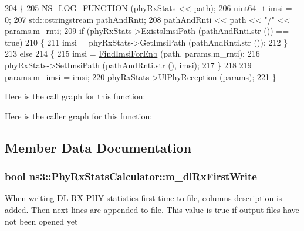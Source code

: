 \begin{DoxyCode}
204 \{
205   \hyperlink{log-macros-disabled_8h_a90b90d5bad1f39cb1b64923ea94c0761}{NS\_LOG\_FUNCTION} (phyRxStats << path);
206   uint64\_t imsi = 0;
207   std::ostringstream pathAndRnti;
208   pathAndRnti << path << \textcolor{stringliteral}{"/"} << params.m\_rnti;
209   \textcolor{keywordflow}{if} (phyRxStats->ExistsImsiPath (pathAndRnti.str ()) == \textcolor{keyword}{true})
210     \{
211       imsi = phyRxStats->GetImsiPath (pathAndRnti.str ());
212     \}
213   \textcolor{keywordflow}{else}
214     \{
215       imsi = \hyperlink{classns3_1_1LteStatsCalculator_af6ffb642f9ef86076a53331e7aefdcb0}{FindImsiForEnb} (path, params.m\_rnti);
216       phyRxStats->SetImsiPath (pathAndRnti.str (), imsi);
217     \}
218 
219   params.m\_imsi = imsi;
220   phyRxStats->UlPhyReception (params);
221 \}
\end{DoxyCode}


Here is the call graph for this function\+:




Here is the caller graph for this function\+:




\subsection{Member Data Documentation}
\subsubsection[{\texorpdfstring{m\+\_\+dl\+Rx\+First\+Write}{m_dlRxFirstWrite}}]{\setlength{\rightskip}{0pt plus 5cm}bool ns3\+::\+Phy\+Rx\+Stats\+Calculator\+::m\+\_\+dl\+Rx\+First\+Write\hspace{0.3cm}{\ttfamily [private]}}\hypertarget{classns3_1_1PhyRxStatsCalculator_a213f01bace4b066672eb60b4e394acf7}{}\label{classns3_1_1PhyRxStatsCalculator_a213f01bace4b066672eb60b4e394acf7}
When writing DL RX P\+HY statistics first time to file, columns description is added. Then next lines are appended to file. This value is true if output files have not been opened yet 
